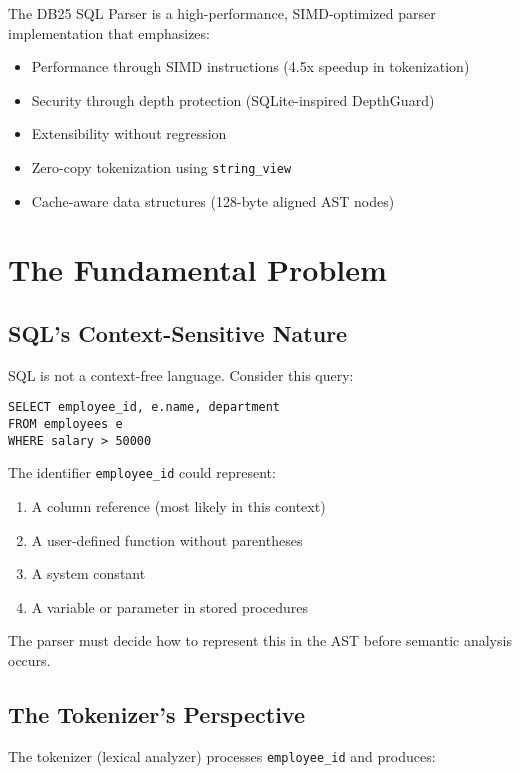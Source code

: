 \documentclass[11pt,a4paper]{article}
\begin{document}
The DB25 SQL Parser is a high-performance, SIMD-optimized parser implementation that emphasizes:
\begin{itemize}
    \item Performance through SIMD instructions (4.5x speedup in tokenization)
    \item Security through depth protection (SQLite-inspired DepthGuard)
    \item Extensibility without regression
    \item Zero-copy tokenization using \texttt{string\_view}
    \item Cache-aware data structures (128-byte aligned AST nodes)
\end{itemize}

\section{The Fundamental Problem}

\subsection{SQL's Context-Sensitive Nature}

SQL is not a context-free language. Consider this query:

\begin{lstlisting}[style=sql]
SELECT employee_id, e.name, department
FROM employees e
WHERE salary > 50000
\end{lstlisting}

The identifier \texttt{employee\_id} could represent:
\begin{enumerate}
    \item A column reference (most likely in this context)
    \item A user-defined function without parentheses
    \item A system constant
    \item A variable or parameter in stored procedures
\end{enumerate}

The parser must decide how to represent this in the AST before semantic analysis occurs.

\subsection{The Tokenizer's Perspective}

The tokenizer (lexical analyzer) processes \texttt{employee\_id} and produces:
\end{document}
